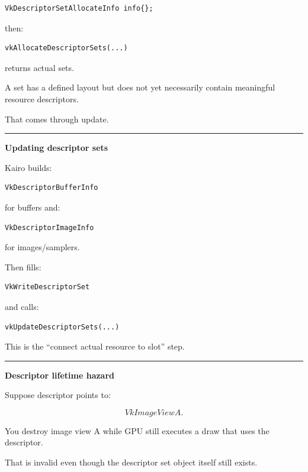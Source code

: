 \begin{verbatim}
VkDescriptorSetAllocateInfo info{};
\end{verbatim}

then:

\begin{verbatim}
vkAllocateDescriptorSets(...)
\end{verbatim}

returns actual sets.

A set has a defined layout but does not yet necessarily contain meaningful resource descriptors.

That comes through update.

\begin{center}\rule{0.5\linewidth}{0.5pt}\end{center}

\textbf{Updating descriptor sets}

Kairo builds:

\begin{verbatim}
VkDescriptorBufferInfo
\end{verbatim}

for buffers and:

\begin{verbatim}
VkDescriptorImageInfo
\end{verbatim}

for images/samplers.

Then fills:

\begin{verbatim}
VkWriteDescriptorSet
\end{verbatim}

and calls:

\begin{verbatim}
vkUpdateDescriptorSets(...)
\end{verbatim}

This is the ``connect actual resource to slot'' step.

\begin{center}\rule{0.5\linewidth}{0.5pt}\end{center}

\textbf{Descriptor lifetime hazard}

Suppose descriptor points to:

\[
VkImageView A.
\]

You destroy image view A while GPU still executes a draw that uses the descriptor.

That is invalid even though the descriptor set object itself still exists.

